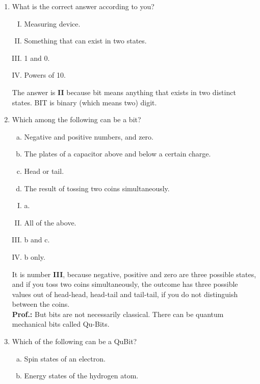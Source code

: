 \documentclass[12pt]{article}
\newcommand\tbf[1]{\textbf{#1}}
\newcommand\tp{\tbf{Prof.: }}
\begin{document}
\begin{enumerate}[1.]
	\item What is the correct answer according to you?
		\begin{enumerate}[I.]
			\item Measuring device.
			\item Something that can exist in two states.
			\item 1 and 0.
			\item Powers of 10. \\ \newline
		\end{enumerate}
		The answer is \tbf{II} because bit means anything that exists in two distinct states. BIT is binary (which means two) digit.
	\item Which among the following can be a bit?
		\begin{enumerate}[a)]
			\item Negative and positive numbers, and zero.
			\item The plates of a capacitor above and below a certain charge.
			\item Head or tail.
			\item The result of tossing two coins simultaneously. \\ \newline
		\end{enumerate}
		\begin{enumerate}[I.]
			\item a.
			\item All of the above.
			\item b and c.
			\item b only. \\ \newline
		\end{enumerate}
		It is number \tbf{III}, because negative, positive and zero are three possible states, and if you toss two coins simultaneously, the outcome has three possible values out of head-head, head-tail and tail-tail, if you do not distinguish between the coins. \\ \newline
\tp But bits are not necessarily classical. There can be quantum mechanical bits called Qu-Bits. \\ \newline
	\item Which of the following can be a QuBit?
		\begin{enumerate}[a)]
			\item Spin states of an electron.
			\item Energy states of the hydrogen atom.

\end{enumerate}
\end{enumerate}
\end{document}
